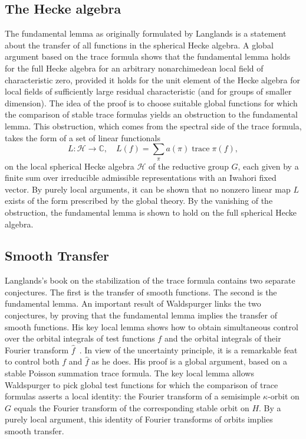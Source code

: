 \documentclass[brochure,english,12pt]{bourbaki}
\def\op#1{{\operatorname{#1}}}
\newcommand{\ring}[1]{\mathbb{#1}}
\begin{document}
\subsection{The Hecke algebra}

The fundamental lemma as originally formulated by Langlands
is a statement about the transfer of all
functions in the spherical Hecke algebra.  A global argument based on
the trace formula shows that the fundamental lemma holds for the full
Hecke algebra for an arbitrary nonarchimedean local field of
characteristic zero, provided it holds for the unit element of the
Hecke algebra for local fields of sufficiently large residual
characteristic (and for groups of smaller dimension).  
The idea of the proof is to choose suitable global
functions for which the comparison of stable trace formulas yields an
obstruction to the fundamental lemma.  This obstruction, which comes from the
spectral side of the trace formula, takes the form
of a set of linear functionals  
\[
L:{\mathcal H}\to\ring{C},\quad L(f) = \sum_\pi a(\pi) \op{trace}\pi(f),
\]
on the local spherical Hecke
algebra ${\mathcal H}$ of the reductive group $G$, each given by a finite sum over
irreducible admissible representations with an Iwahori fixed vector.
By purely local arguments, it
can be shown that no nonzero linear map $L$ exists of the form
prescribed by the global theory. 
By the vanishing of the obstruction,
the fundamental lemma is shown to hold on the full spherical Hecke algebra.


\subsection{Smooth Transfer}

Langlands's book on the stabilization of the trace formula contains
two separate conjectures.  The first is the transfer of smooth
functions.  The second is the fundamental lemma.  An important result
of Waldspurger links the two conjectures, by proving that the
fundamental lemma implies the transfer of smooth functions.  
His key local lemma shows how to obtain simultaneous control over the
orbital integrals of test functions $f$ and the orbital integrals of
their Fourier transform $\hat f$~\cite[Prop.~8.2]{W}.  
In view of the uncertainty principle, it is a remarkable feat to
control both $f$ and $\hat f$ as he does.
His proof is a global argument, based on a stable Poisson summation trace
formula.  The key local lemma allows Waldspurger to pick global test
functions for which the comparison of trace formulas asserts a
local identity: the Fourier transform of a semisimple
$\kappa$-orbit on $G$ equals the Fourier transform of the corresponding
stable orbit on $H$.  By a purely local argument, this identity of Fourier
transforms of orbits implies smooth transfer.
\end{document}
